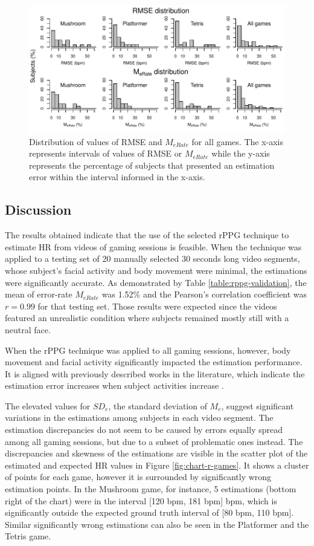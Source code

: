 \begin{figure}[!h]
\centering
\includegraphics[width=1.0\textwidth]{figures/hist-rmse-mrate.pdf}
\caption{Distribution of values of RMSE and $M_{eRate}$ for all games. The x-axis represents intervals of values of RMSE or $M_{eRate}$ while the y-axis represents the percentage of subjects that presented an estimation error within the interval informed in the x-axis.}
\label{fig:chart-hists}
\end{figure}

\subsection{Discussion}

The results obtained indicate that the use of the selected rPPG technique to estimate HR from videos of gaming sessions is feasible. When the technique was applied to a testing set of 20 manually selected 30 seconds long video segments, whose subject's facial activity and body movement were minimal, the estimations were significantly accurate. As demonstrated by Table \ref{table:rppg-validation}, the mean of error-rate $M_{eRate}$ was 1.52\% and the Pearson's correlation coefficient was $r = 0.99$ for that testing set. Those results were expected since the videos featured an unrealistic condition where subjects remained mostly still with a neutral face.

When the rPPG technique was applied to all gaming sessions, however, body movement and facial activity significantly impacted the estimation performance. It is aligned with previously described works in the literature, which indicate the estimation error increases when subject activities increase \parencite{Wang_2016novel}.

The elevated values for $SD_e$, the standard deviation of $M_e$, suggest significant variations in the estimations among subjects in each video segment. The estimation discrepancies do not seem to be caused by errors equally spread among all gaming sessions, but due to a subset of problematic ones instead. The discrepancies and skewness of the estimations are visible in the scatter plot of the estimated and expected HR values in Figure \ref{fig:chart-r-games}. It shows a cluster of points for each game, however it is surrounded by significantly wrong estimation points. In the Mushroom game, for instance, 5 estimations (bottom right of the chart) were in the interval [120 bpm, 181 bpm] bpm, which is significantly outside the expected ground truth interval of [80 bpm, 110 bpm]. Similar significantly wrong estimations can also be seen in the Platformer and the Tetris game.

